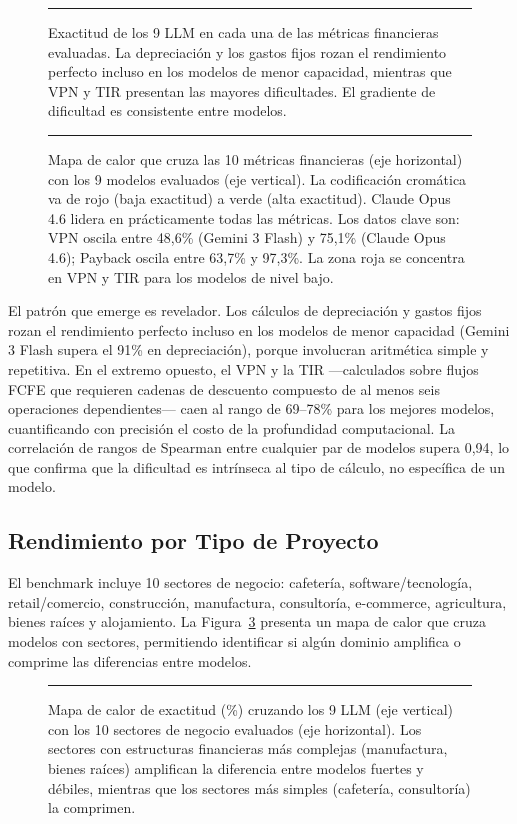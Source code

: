 \documentclass[12pt,a4paper]{article}
\begin{document}
\begin{figure}[ht]
\centering
\rule{0.9\linewidth}{5cm}
\caption{Exactitud de los 9 LLM en cada una de las métricas financieras evaluadas. La depreciación y los gastos fijos rozan el rendimiento perfecto incluso en los modelos de menor capacidad, mientras que VPN y TIR presentan las mayores dificultades. El gradiente de dificultad es consistente entre modelos.}
\label{fig:metricas}
\end{figure}

\begin{figure}[ht]
\centering
\rule{0.9\linewidth}{5cm}
\caption{Mapa de calor que cruza las 10 métricas financieras (eje horizontal) con los 9 modelos evaluados (eje vertical). La codificación cromática va de rojo (baja exactitud) a verde (alta exactitud). Claude Opus 4.6 lidera en prácticamente todas las métricas. Los datos clave son: VPN oscila entre 48,6\% (Gemini 3 Flash) y 75,1\% (Claude Opus 4.6); Payback oscila entre 63,7\% y 97,3\%. La zona roja se concentra en VPN y TIR para los modelos de nivel bajo.}
\label{fig:heatmap}
\end{figure}

El patrón que emerge es revelador. Los cálculos de depreciación y gastos fijos rozan el rendimiento perfecto incluso en los modelos de menor capacidad (Gemini 3 Flash supera el 91\% en depreciación), porque involucran aritmética simple y repetitiva. En el extremo opuesto, el VPN y la TIR ---calculados sobre flujos FCFE que requieren cadenas de descuento compuesto de al menos seis operaciones dependientes--- caen al rango de 69--78\% para los mejores modelos, cuantificando con precisión el costo de la profundidad computacional. La correlación de rangos de Spearman entre cualquier par de modelos supera 0,94, lo que confirma que la dificultad es intrínseca al tipo de cálculo, no específica de un modelo.

\subsection{Rendimiento por Tipo de Proyecto}

El benchmark incluye 10 sectores de negocio: cafetería, software/tecnología, retail/comercio, construcción, manufactura, consultoría, e-commerce, agricultura, bienes raíces y alojamiento. La Figura~\ref{fig:sectores} presenta un mapa de calor que cruza modelos con sectores, permitiendo identificar si algún dominio amplifica o comprime las diferencias entre modelos.

\begin{figure}[ht]
\centering
\rule{0.9\linewidth}{5cm}
\caption{Mapa de calor de exactitud (\%) cruzando los 9 LLM (eje vertical) con los 10 sectores de negocio evaluados (eje horizontal). Los sectores con estructuras financieras más complejas (manufactura, bienes raíces) amplifican la diferencia entre modelos fuertes y débiles, mientras que los sectores más simples (cafetería, consultoría) la comprimen.}
\label{fig:sectores}
\end{figure}
\end{document}
